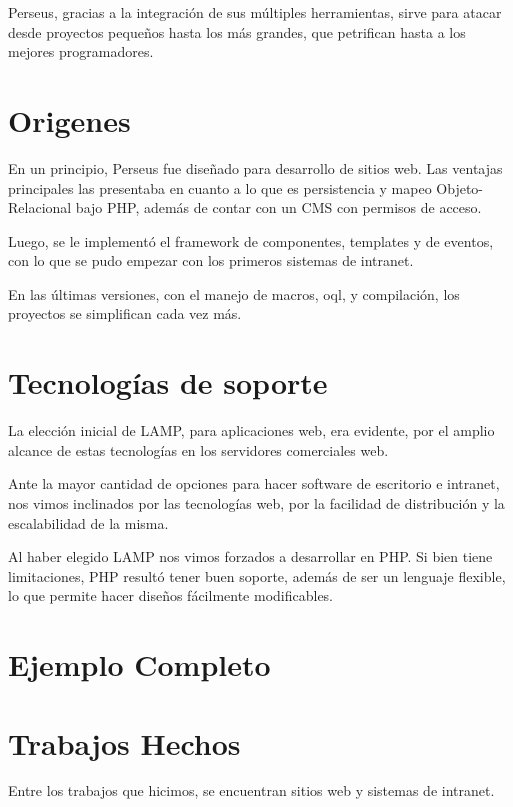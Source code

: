 \documentclass[a4paper,10pt]{article}
\begin{document}
Perseus, gracias a la integración de sus múltiples herramientas, sirve para atacar desde proyectos pequeños hasta los más grandes, que petrifican hasta a los mejores programadores.

\section{Origenes}

En un principio, Perseus fue diseñado para desarrollo de sitios web. Las ventajas principales las presentaba en cuanto a lo que es persistencia y mapeo Objeto-Relacional bajo PHP, además de contar con un CMS con permisos de acceso.

Luego, se le implementó el framework de componentes, templates y de eventos, con lo que se pudo empezar con los primeros sistemas de intranet.

En las últimas versiones, con el manejo de macros, oql, y compilación, los proyectos se simplifican cada vez más.

\section{Tecnologías de soporte}

La elección inicial de LAMP, para aplicaciones web, era evidente, por el amplio alcance de estas tecnologías en los servidores comerciales web.

Ante la mayor cantidad de opciones para hacer software de escritorio e intranet, nos vimos inclinados por las tecnologías web, por la facilidad de distribución y la escalabilidad de la misma.

Al haber elegido LAMP nos vimos forzados a desarrollar en PHP. Si bien tiene limitaciones, PHP resultó tener buen soporte, además de ser un lenguaje flexible, lo que permite hacer diseños fácilmente modificables.



\section{Ejemplo Completo}
\section{Trabajos Hechos}
Entre los trabajos que hicimos, se encuentran sitios web y sistemas de intranet.

\end{document}
